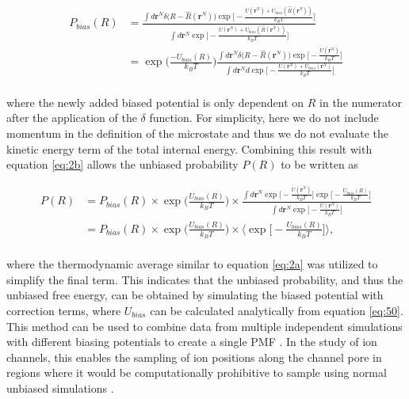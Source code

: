\begin{refsection}
\begin{equation}
\label{eq:5}
\begin{split}
 P_{bias}(R) & = \frac{\int d\mathbf{r}^N \delta \big( R - \hat{R}(\mathbf{r}^N) \big) \exp \Big[ - \frac{U(\mathbf{r}^N) + U_{bias}(\hat{R}(\mathbf{r}^N))}{k_B T} \Big]}{\int d\mathbf{r}^N \exp \Big[ - \frac{U(\mathbf{r}^N) + U_{bias}(\hat{R}(\mathbf{r}^N))}{k_B T} \Big]} \\
                     & = \exp \Big( \frac{-U_{bias}(R)}{k_B T} \Big) \frac{\int d\mathbf{r}^N \delta \big( R - \hat{R}(\mathbf{r}^N) \big) \exp \Big[ - \frac{U(\mathbf{r}^N)}{k_B T} \Big]}{\int d\mathbf{r}^N d \exp \Big[ - \frac{U(\mathbf{r}^N) + U_{bias}(\mathbf{r}^N)}{k_B T} \Big]} \\
 \end{split}
\end{equation}

where the newly added biased potential is only dependent on $R$ in the numerator after the application of the $\delta$ function. For simplicity, here we do not include momentum in the definition of the microstate and thus we do not evaluate the kinetic energy term of the total internal energy. Combining this result with equation \ref{eq:2b} allows the unbiased probability $P(R)$ to be written as

\begin{equation}
\label{eq:5b}
\begin{split}
 P(R) & = P_{bias}(R) \times \exp \Big( \frac{U_{bias}(R)}{k_B T} \Big) \times \frac{\int d\mathbf{r}^N \exp \big[ - \frac{U(\mathbf{r}^N)}{k_B T} \big]  \exp \big[ - \frac{U_{bias}(R)}{k_B T} \big]   }{\int d\mathbf{r}^N \exp \big[ - \frac{U(\mathbf{r}^N)}{k_B T} \big]}   \\
         & = P_{bias}(R) \times \exp \Big( \frac{U_{bias}(R)}{k_B T} \Big) \times \langle \exp \big[ - \frac{U_{bias}(R)}{k_B T} \big] \rangle,  \\
 \end{split}
\end{equation}

where the thermodynamic average similar to equation \ref{eq:2a} was utilized to simplify the final term. This indicates that the unbiased probability, and thus the unbiased free energy, can be obtained by simulating the biased potential with correction terms, where $U_{bias}$ can be calculated analytically from equation \ref{eq:50}. This method can be used to combine data from multiple independent simulations with different biasing potentials to create a single PMF \cite{Hub:2010hq,Kumar:1992bv}. In the study of ion channels, this enables the sampling of ion positions along the channel pore in regions where it would be computationally prohibitive to sample using normal unbiased simulations \cite{Allen:2004vs,Allen:2006vy}.

\printbibliography[heading=subbibnumbered,title={References}]
 \end{refsection}
